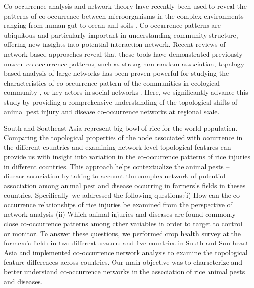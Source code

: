 Co-occurrence analysis and network theory have recently been used to reveal the patterns of co-occurrence between microorganisms in the complex environments ranging from human gut to ocean and soils \citep{Faust_2012_Microbial_co,Ma_2016_Geographic}. Co-occurrence patterns are ubiquitous and particularly important in understanding community structure, offering new insights into potential interaction network. Recent reviews of network based approaches reveal that these tools have demonstrated previously unseen co-occurrence patterns, such as strong non-random association, topology based analysis of large networks has been proven powerful for studying the characteristics of co-occurrence pattern of the communities in ecological community \citep{Williams_2014_demonstrating, Barberan_2012_Network}, or key actors in social networks \citep{Crowston_2006_Hierarchy}. Here, we significantly advance this study by providing a comprehensive understanding of the topological shifts of animal pest injury and disease co-occurrence networks at regional scale.

South and Southeast Asia represent big bowl of rice for the world population. Comparing the topological properties of the node associated with occurrence in the different countries and examining network level topological features can provide us with insight into variation in the co-occurrence patterns of rice injuries in different countries. This approach helps contextualize the animal pests -- disease association by taking to account the complex network of potential association among animal pest and disease occurring in farmers's fields in theses countries. Specifically, we addressed the following questions:(i) How can the co-occurrence relationships of rice injuries be examined from the perspective of network analysis (ii) Which animal injuries and diseases are found commonly close co-occurrence patterns among other variables in order to target to control or monitor. To answer these questions, we performed crop health survey at the farmers's fields in two different seasons and five countries in South and Southeast Asia and implemented co-occurrence network analysis to examine the topological feature differences  across countries. Our main objective was to characterize and better understand co-occurrence networks in the association of rice animal pests and diseases.

